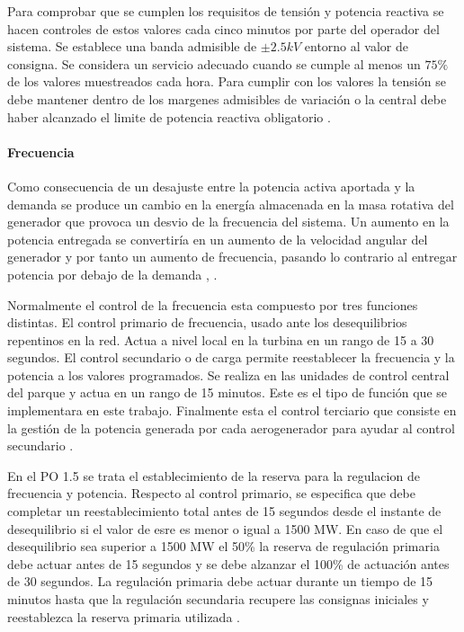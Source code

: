 \documentclass{book}
\begin{document}
Para comprobar que se cumplen los requisitos de tensi\'on y potencia reactiva se hacen controles de estos valores cada cinco minutos por parte del operador del sistema. Se establece una banda admisible de $\pm2.5 kV$ entorno al valor de consigna. Se considera un servicio adecuado cuando se cumple al menos un $75\%$ de los valores muestreados cada hora. Para cumplir con los valores la tensi\'on  se debe mantener dentro de los margenes admisibles de variaci\'on o la central debe haber alcanzado el limite de potencia reactiva obligatorio \cite{PO74}. \par

		\paragraph{Frecuencia}
Como consecuencia de un desajuste entre la potencia activa aportada y la demanda se produce un cambio en la energía almacenada en la masa rotativa del generador que provoca un desvio de la frecuencia del sistema. Un aumento en la potencia entregada se convertir\'ia en un aumento de la velocidad angular del generador y por tanto un aumento de frecuencia, pasando lo contrario al entregar potencia por debajo de la demanda \cite{WFgridcode}, \cite{FrecuencyLvL}. \par

Normalmente el control de la frecuencia esta compuesto por tres funciones distintas. El control primario de frecuencia, usado ante los desequilibrios repentinos en la red. Actua a nivel local en la turbina en un rango de 15 a 30 segundos. El control secundario o de carga permite reestablecer la frecuencia y la potencia a los valores programados. Se realiza en las unidades de control central del parque y actua en un rango de 15 minutos. Este es el tipo de funci\'on que se implementara en este trabajo. Finalmente esta el control terciario que consiste en la gesti\'on de la potencia generada por cada aerogenerador para ayudar al control secundario \cite{WFgridcode}. \par

En el PO 1.5 se trata el establecimiento de la reserva para la regulacion de frecuencia y potencia. Respecto al control primario, se especifica que debe completar un reestablecimiento total antes de 15 segundos desde el instante de desequilibrio si el valor de esre es menor o igual a 1500 MW. En caso de que el desequilibrio sea superior a 1500 MW el 50\% la reserva de regulaci\'on primaria debe actuar antes de 15 segundos y se debe alzanzar el 100\% de actuaci\'on antes de 30 segundos. La regulaci\'on primaria debe actuar durante un tiempo de 15 minutos hasta que la regulaci\'on secundaria recupere las consignas iniciales y reestablezca la reserva primaria utilizada \cite{PO15}. \par
\end{document}
